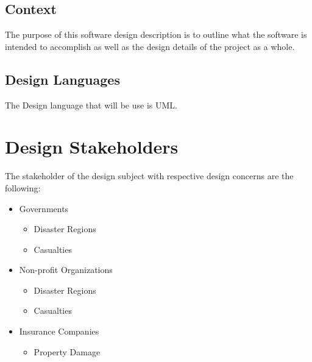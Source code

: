\documentclass[12pt]{article}
\begin{document}
    \subsection{Context}
        The purpose of this software design description is to outline what the software is intended to accomplish as well as the design details of the project as a whole.
    \subsection{Design Languages}
    The Design language that will be use is UML.
        
\section{Design Stakeholders}
    The stakeholder of the design subject with respective design concerns are the following:
    \begin{itemize}
        \item Governments
        \begin{itemize}
            \item Disaster Regions %
            \item Casualties
        \end{itemize}
        
        \item Non-profit Organizations
        \begin{itemize}
            \item Disaster Regions %
            \item Casualties
        \end{itemize}
        
        \item Insurance Companies
        \begin{itemize}
            \item Property Damage
        \end{itemize}
        
    \end{itemize}
\end{document}
